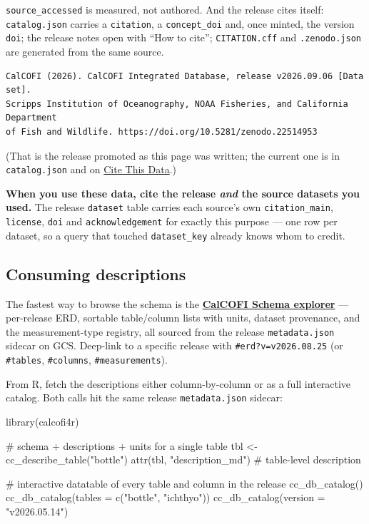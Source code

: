\documentclass[
  letterpaper,
  DIV=11,
  numbers=noendperiod]{scrreprt}
\newenvironment{Shaded}{\begin{snugshade}}{\end{snugshade}}
\newcommand{\AttributeTok}[1]{\textcolor[rgb]{0.40,0.45,0.13}{#1}}
\newcommand{\CommentTok}[1]{\textcolor[rgb]{0.37,0.37,0.37}{#1}}
\newcommand{\FunctionTok}[1]{\textcolor[rgb]{0.28,0.35,0.67}{#1}}
\newcommand{\NormalTok}[1]{\textcolor[rgb]{0.00,0.23,0.31}{#1}}
\newcommand{\OtherTok}[1]{\textcolor[rgb]{0.00,0.23,0.31}{#1}}
\newcommand{\StringTok}[1]{\textcolor[rgb]{0.13,0.47,0.30}{#1}}
\begin{document}
\texttt{source\_accessed} is measured, not authored. And the release
cites itself: \texttt{catalog.json} carries a \texttt{citation}, a
\texttt{concept\_doi} and, once minted, the version \texttt{doi}; the
release notes open with ``How to cite''; \texttt{CITATION.cff} and
\texttt{.zenodo.json} are generated from the same source.

\begin{verbatim}
CalCOFI (2026). CalCOFI Integrated Database, release v2026.09.06 [Data set].
Scripps Institution of Oceanography, NOAA Fisheries, and California Department
of Fish and Wildlife. https://doi.org/10.5281/zenodo.22514953
\end{verbatim}

(That is the release promoted as this page was written; the current one
is in \texttt{catalog.json} and on \href{cite.qmd}{Cite This Data}.)

\textbf{When you use these data, cite the release \emph{and} the source
datasets you used.} The release \texttt{dataset} table carries each
source's own \texttt{citation\_main}, \texttt{license}, \texttt{doi} and
\texttt{acknowledgement} for exactly this purpose --- one row per
dataset, so a query that touched \texttt{dataset\_key} already knows
whom to credit.

\subsection{Consuming descriptions}\label{consuming-descriptions}

The fastest way to browse the schema is the
\href{https://calcofi.io/db-schema/}{\textbf{CalCOFI Schema explorer}}
--- per-release ERD, sortable table/column lists with units, dataset
provenance, and the measurement-type registry, all sourced from the
release \texttt{metadata.json} sidecar on GCS. Deep-link to a specific
release with \texttt{\#erd?v=v2026.08.25} (or \texttt{\#tables},
\texttt{\#columns}, \texttt{\#measurements}).

From R, fetch the descriptions either column-by-column or as a full
interactive catalog. Both calls hit the same release
\texttt{metadata.json} sidecar:

\begin{Shaded}
\begin{Highlighting}[]
\FunctionTok{library}\NormalTok{(calcofi4r)}

\CommentTok{\# schema + descriptions + units for a single table}
\NormalTok{tbl }\OtherTok{\textless{}{-}} \FunctionTok{cc\_describe\_table}\NormalTok{(}\StringTok{"bottle"}\NormalTok{)}
\FunctionTok{attr}\NormalTok{(tbl, }\StringTok{"description\_md"}\NormalTok{)    }\CommentTok{\# table{-}level description}

\CommentTok{\# interactive datatable of every table and column in the release}
\FunctionTok{cc\_db\_catalog}\NormalTok{()}
\FunctionTok{cc\_db\_catalog}\NormalTok{(}\AttributeTok{tables =} \FunctionTok{c}\NormalTok{(}\StringTok{"bottle"}\NormalTok{, }\StringTok{"ichthyo"}\NormalTok{))}
\FunctionTok{cc\_db\_catalog}\NormalTok{(}\AttributeTok{version =} \StringTok{"v2026.05.14"}\NormalTok{)}
\end{Highlighting}
\end{Shaded}
\end{document}
